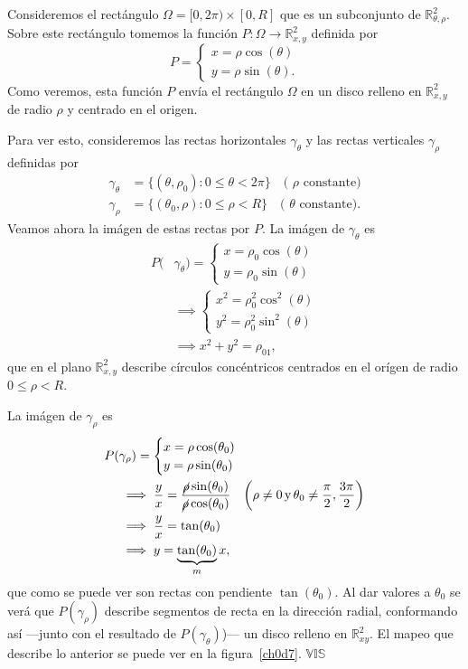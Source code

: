 \documentclass[mid,fleqn,draft,twoside]{notasdeclase}
\renewcommand{\t}{\times}
\newcommand{\R}{\mathbb{R}}
\begin{document}

\begin{ejem}[caso 2-2]
	Consideremos el rectángulo $\Omega =  [0,2\pi)\t[0,R] $ que es un subconjunto  de $\R^2_{\theta,\rho}$. Sobre este rectángulo tomemos la función $P\colon\Omega\to\R^2_{x,y}$ definida por
	\[ P = \begin{cases}
	x = \rho\cos(\theta) \\
	y = \rho\sin(\theta).
	\end{cases} \]
	Como veremos, esta función $P$ envía el rectángulo $\Omega$ en un disco relleno en $\R^2_{x,y}$ de radio $\rho$ y centrado en el origen.
	
	Para ver esto, consideremos las rectas horizontales $\gamma_\theta$ y las rectas verticales $\gamma_\rho$ definidas por
	\begin{align*}
		\gamma_\theta &= \{(\theta,\rho_0) : 0\leq\theta<2\pi \} \quad\text{( $\rho$ constante)} \\
		\gamma_\rho &= \{(\theta_0,\rho): 0\leq\rho<R \} \quad\text{( $\theta$ constante).}
	\end{align*}
	Veamos ahora la imágen de estas rectas por $P$. La imágen de $\gamma_\theta$ es
%	
	\begin{align*}
		P(&\gamma_\theta) = \begin{cases}
		x = \rho_0\cos(\theta) \\
		y = \rho_0\sin(\theta)
		\end{cases} \\
		&\implies \begin{cases}
		x^2 = \rho^2_0\cos^2(\theta) \\
		y^2 = \rho^2_0\sin^2(\theta)
		\end{cases} \\
		&\implies x^2+y^2 = \rho_01,
	\end{align*} 
	que en el plano $\R^2_{x,y}$ describe círculos concéntricos centrados en el orígen de radio $0\leq\rho<R$.
	
	La imágen de $\gamma_\rho$ es
	\begin{align*}
		P(&\gamma_\rho) = \begin{cases}
		x = \rho\cos(\theta_0) \\
		y = \rho\sin(\theta_0)
		\end{cases} \\
		&\implies \frac{y}{x} = \frac{\cancel{\rho}\sin(\theta_0)}{\cancel{\rho}\cos(\theta_0)} \quad \bigg(\rho\neq 0\,\text{y}\, \theta_0\neq \frac{\pi}{2},\frac{3\pi}{2}\bigg) \\
		&\implies \frac{y}{x} = \tan(\theta_0) \\
		&\implies y = \underbrace{\tan(\theta_0)}_m x,
	\end{align*}
	que como se puede ver son rectas con pendiente $\tan(\theta_0)$. Al dar valores a $\theta_0$ se verá que $P(\gamma_\rho) $ describe segmentos de recta en la dirección radial, conformando así ---junto con el resultado de $P(\gamma_\theta)$)--- un disco relleno en $\R^2_{xy}$. El mapeo que describe lo anterior se puede ver en la figura~\ref{ch0d7}. $\mathbb{VIS}$

	
\end{ejem}
\end{document}
